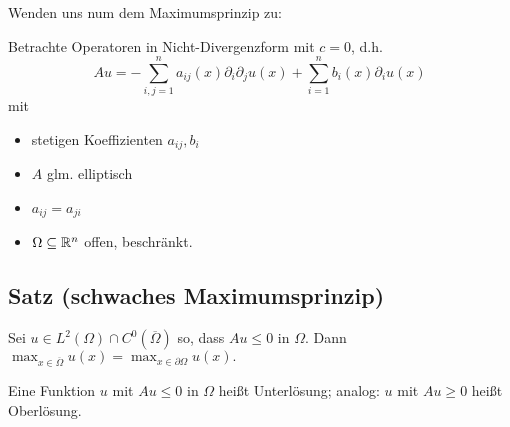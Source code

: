 Wenden uns num dem Maximumsprinzip zu:

Betrachte Operatoren in Nicht-Divergenzform mit $c = 0$, d.h. 
$$
Au = - \sum_{i,j = 1}^n a_{ij}(x) \partial_i \partial_j u(x) + \sum_{i = 1}^n b_i(x) \partial_i u(x)
$$
mit 
\begin{itemize}
  \item stetigen Koeffizienten $a_{ij}, b_i$
  \item $A$ glm. elliptisch
  \item $a_{ij} = a_{ji}$
  \item $\Omega \subseteq \mathbb{R}^n$ offen, beschränkt.
\end{itemize}

\subsection{Satz (schwaches Maximumsprinzip)}

Sei $u \in L^2(\Omega) \cap C^0(\overline \Omega)$ so, dass $Au \leq 0$ in $\Omega$. Dann $\max_{x \in \overline\Omega} u(x) = \max_{x \in \partial\Omega} u(x).$

\begin{bem}
  Eine Funktion $u$ mit $Au \leq 0$ in $\Omega$ heißt Unterlösung; analog: $u$ mit $A u \geq 0$ heißt Oberlösung.
\end{bem}

